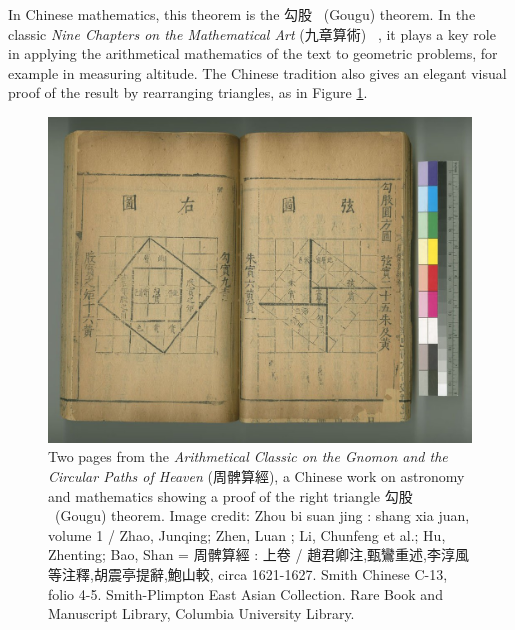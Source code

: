 \documentclass{notices}
\begin{document}
\begin{CJK*}{UTF8}{bsmi}
In Chinese mathematics, this theorem is the 勾股 \ (Gougu) theorem. In the classic \emph{Nine Chapters on the Mathematical Art} (九章算術)~\cite{Shen:NCMCC}
, it plays a key role in applying the arithmetical mathematics of the text to geometric problems, for example in %
measuring altitude. The Chinese tradition also gives an elegant visual proof of the result by rearranging triangles, as in Figure \ref{fig:ChineseTriangles}. 
\begin{figure}
    \includegraphics[width=1.\linewidth]{images/ChineseTriangles.jpg}
    \caption{Two pages from the \textit{Arithmetical Classic on the Gnomon and the Circular Paths of Heaven} (周髀算經), a Chinese work on astronomy and mathematics showing a proof of the right triangle 勾股 \ (Gougu) theorem. Image credit: Zhou bi suan jing : shang xia juan, volume 1 / Zhao, Junqing; Zhen, Luan ; Li, Chunfeng et al.; Hu, Zhenting; Bao, Shan = 周髀算經 : 上卷 / 趙君卿注,甄鸞重述,李淳風等注釋,胡震亭提辭,鮑山較, circa 1621-1627. Smith Chinese C-13, folio 4-5. Smith-Plimpton East Asian Collection. Rare Book and Manuscript Library, Columbia University Library.}
    \label{fig:ChineseTriangles}
\end{figure}
\end{CJK*}
\end{document}
